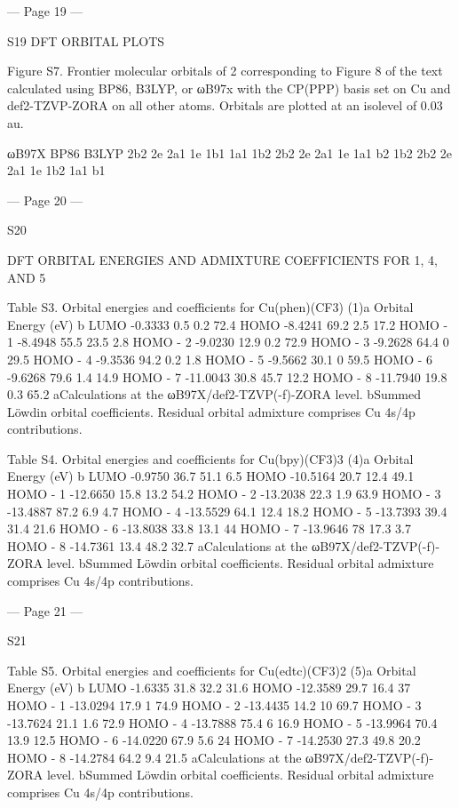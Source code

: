  
 
 
 
 
 
 


--- Page 19 ---
 
S19 
DFT ORBITAL PLOTS
 
Figure S7. Frontier molecular orbitals of 2 corresponding to Figure 8 of the text calculated using 
BP86, B3LYP, or ωB97x with the CP(PPP) basis set on Cu and def2-TZVP-ZORA on all other 
atoms. Orbitals are plotted at an isolevel of 0.03 au. 
 
 
ωB97X
BP86
B3LYP
2b2
2e
2a1
1e
1b1
1a1
1b2
2b2
2e
2a1
1e
1a1
b2
1b2
2b2
2e
2a1
1e
1b2
1a1
b1


--- Page 20 ---
 
S20 
 
DFT ORBITAL ENERGIES AND ADMIXTURE COEFFICIENTS 
FOR 1, 4, AND 5 
 
Table S3. Orbital energies and coefficients for Cu(phen)(CF3) (1)a 
Orbital 
Energy (eV) 
b 
LUMO 
-0.3333 
0.5 
0.2 
72.4 
HOMO 
-8.4241 
69.2 
2.5 
17.2 
HOMO - 1 
-8.4948 
55.5 
23.5 
2.8 
HOMO - 2 
-9.0230 
12.9 
0.2 
72.9 
HOMO - 3 
-9.2628 
64.4 
0 
29.5 
HOMO - 4 
-9.3536 
94.2 
0.2 
1.8 
HOMO - 5 
-9.5662 
30.1 
0 
59.5 
HOMO - 6 
-9.6268 
79.6 
1.4 
14.9 
HOMO - 7 
-11.0043 
30.8 
45.7 
12.2 
HOMO - 8 
-11.7940 
19.8 
0.3 
65.2 
aCalculations at the ωB97X/def2-TZVP(-f)-ZORA level. bSummed Löwdin orbital coefficients. 
Residual orbital admixture comprises Cu 4s/4p contributions. 
 
Table S4. Orbital energies and coefficients for Cu(bpy)(CF3)3 (4)a 
Orbital 
Energy (eV) 
b 
LUMO 
-0.9750 
36.7 
51.1 
6.5 
HOMO 
-10.5164 
20.7 
12.4 
49.1 
HOMO - 1 
-12.6650 
15.8 
13.2 
54.2 
HOMO - 2 
-13.2038 
22.3 
1.9 
63.9 
HOMO - 3 
-13.4887 
87.2 
6.9 
4.7 
HOMO - 4 
-13.5529 
64.1 
12.4 
18.2 
HOMO - 5 
-13.7393 
39.4 
31.4 
21.6 
HOMO - 6 
-13.8038 
33.8 
13.1 
44 
HOMO - 7 
-13.9646 
78 
17.3 
3.7 
HOMO - 8 
-14.7361 
13.4 
48.2 
32.7 
aCalculations at the ωB97X/def2-TZVP(-f)-ZORA level. bSummed Löwdin orbital coefficients. 
Residual orbital admixture comprises Cu 4s/4p contributions. 
 
 


--- Page 21 ---
 
S21 
 
Table S5. Orbital energies and coefficients for Cu(edtc)(CF3)2 (5)a 
Orbital 
Energy (eV) 
b 
LUMO 
-1.6335 
31.8 
32.2 
31.6 
HOMO 
-12.3589 
29.7 
16.4 
37 
HOMO - 1 
-13.0294 
17.9 
1 
74.9 
HOMO - 2 
-13.4435 
14.2 
10 
69.7 
HOMO - 3 
-13.7624 
21.1 
1.6 
72.9 
HOMO - 4 
-13.7888 
75.4 
6 
16.9 
HOMO - 5 
-13.9964 
70.4 
13.9 
12.5 
HOMO - 6 
-14.0220 
67.9 
5.6 
24 
HOMO - 7 
-14.2530 
27.3 
49.8 
20.2 
HOMO - 8 
-14.2784 
64.2 
9.4 
21.5 
aCalculations at the ωB97X/def2-TZVP(-f)-ZORA level. bSummed Löwdin orbital coefficients. 
Residual orbital admixture comprises Cu 4s/4p contributions. 
 
